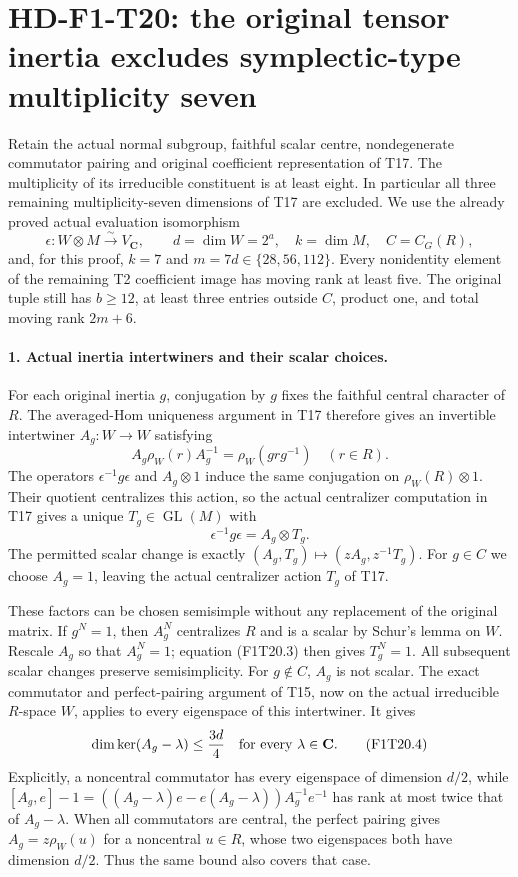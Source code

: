 \section[HD-F1-T20: exclusion of symplectic multiplicity seven]{HD-F1-T20: the original tensor inertia excludes symplectic-type multiplicity seven}
\label{sec:f1-symplectic-seventh-multiplicity}

Retain the actual normal subgroup, faithful scalar centre,
nondegenerate commutator pairing and original coefficient
representation of T17. The multiplicity of its irreducible
constituent is at least eight. In particular all three
remaining multiplicity-seven dimensions of T17 are excluded.
We use the already proved actual evaluation isomorphism
\[
 \epsilon:W\otimes M\xrightarrow{\sim}V_{\mathbf C},
 \qquad d=\dim W=2^a,\quad k=\dim M,
 \quad C=C_G(R),
 \tag{F1T20.1}
\]
and, for this proof, \(k=7\) and
\(m=7d\in\{28,56,112\}\). Every nonidentity
element of the remaining T2 coefficient image has moving
rank at least five. The original tuple still has
\(b\ge12\), at least three entries outside \(C\),
product one, and total moving rank \(2m+6\).

\paragraph{1. Actual inertia intertwiners and their scalar choices.}
For each original inertia \(g\), conjugation by \(g\)
fixes the faithful central character of \(R\).
The averaged-Hom uniqueness argument in T17 therefore
gives an invertible intertwiner \(A_g:W\to W\) satisfying
\[
 A_g\rho_W(r)A_g^{-1}=\rho_W(grg^{-1})
 \quad(r\in R).
 \tag{F1T20.2}
\]
The operators \(\epsilon^{-1}g\epsilon\) and
\(A_g\otimes1\) induce the same conjugation on
\(\rho_W(R)\otimes1\). Their quotient centralizes this
action, so the actual centralizer computation in T17 gives
a unique \(T_g\in\operatorname{GL}(M)\) with
\[
       \epsilon^{-1}g\epsilon=A_g\otimes T_g.
 \tag{F1T20.3}
\]
The permitted scalar change is exactly
\((A_g,T_g)\mapsto(zA_g,z^{-1}T_g)\).
For \(g\in C\) we choose \(A_g=1\), leaving the
actual centralizer action \(T_g\) of T17.

These factors can be chosen semisimple without any
replacement of the original matrix. If \(g^N=1\),
then \(A_g^N\) centralizes \(R\) and is a scalar by
Schur's lemma on \(W\). Rescale \(A_g\) so that
\(A_g^N=1\); equation (F1T20.3) then gives
\(T_g^N=1\). All subsequent scalar changes preserve
semisimplicity. For \(g\notin C\), \(A_g\) is not
scalar. The exact commutator and perfect-pairing argument
of T15, now on the actual irreducible \(R\)-space \(W\),
applies to every eigenspace of this intertwiner. It gives
\[
 \dim\ker(A_g-\lambda)\le\frac{3d}{4}
 \quad\hbox{for every }\lambda\in\mathbf C.
 \tag{F1T20.4}
\]
Explicitly, a noncentral commutator has every eigenspace
of dimension \(d/2\), while
\([A_g,e]-1=((A_g-\lambda)e-e(A_g-\lambda))A_g^{-1}e^{-1}\)
has rank at most twice that of \(A_g-\lambda\).
When all commutators are central, the perfect pairing
gives \(A_g=z\rho_W(u)\) for a noncentral \(u\in R\),
whose two eigenspaces both have dimension \(d/2\).
Thus the same bound also covers that case.


